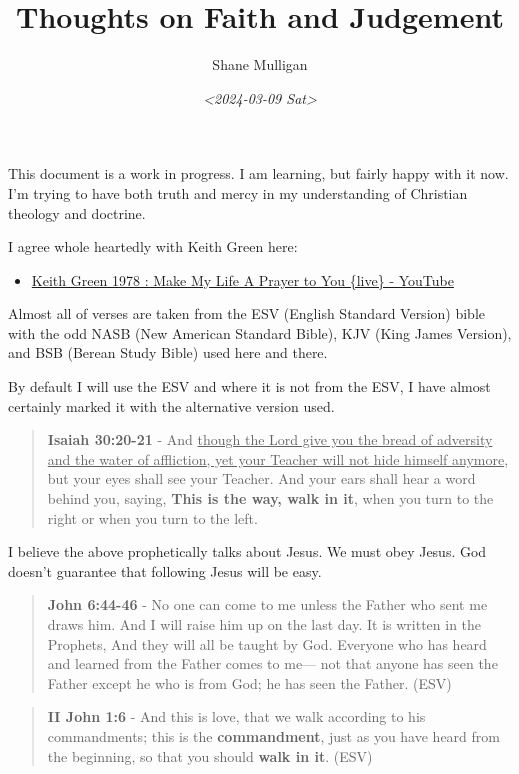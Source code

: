 \documentclass[11pt]{article}
\author{Shane Mulligan}
\date{\textit{<2024-03-09 Sat>}}
\title{Thoughts on Faith and Judgement}
\begin{document}
\maketitle
This document is a work in progress. I am learning, but fairly happy with it now.
I'm trying to have both truth and mercy in my understanding of Christian theology and doctrine.

I agree whole heartedly with Keith Green here:
\begin{itemize}
\item \href{https://www.youtube.com/watch?v=z7oCa9BvO9g}{Keith Green 1978 : Make My Life A Prayer to You \{live\} - YouTube}
\end{itemize}

Almost all of verses are taken from the ESV
(English Standard Version) bible with the odd NASB
(New American Standard Bible), KJV (King
James Version), and BSB (Berean Study Bible) used here and there.

By default I will use the ESV and where it is
not from the ESV, I have almost certainly marked it with the alternative version used.

\begin{quote}
\textbf{Isaiah 30:20-21} - And \uline{though the Lord give you the bread of adversity and the water of affliction, yet your Teacher will not hide himself anymore}, but your eyes shall see your Teacher. And your ears shall hear a word behind you, saying, \textbf{This is the way, walk in it}, when you turn to the right or when you turn to the left.
\end{quote}

I believe the above prophetically talks about Jesus. We must obey Jesus. God doesn't guarantee that following Jesus will be easy.

\begin{quote}
\textbf{John 6:44-46} - No one can come to me unless the Father who sent me draws him. And I will raise him up on the last day. It is written in the Prophets, And they will all be taught by God. Everyone who has heard and learned from the Father comes to me— not that anyone has seen the Father except he who is from God; he has seen the Father. (ESV)
\end{quote}

\begin{quote}
\textbf{II John 1:6} - And this is love, that we walk according to his commandments; this is the \textbf{commandment}, just as you have heard from the beginning, so that you should \textbf{walk in it}. (ESV)
\end{quote}
\end{document}
